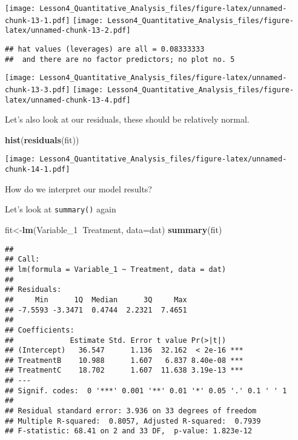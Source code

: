 \documentclass[
]{article}
\newenvironment{Shaded}{\begin{snugshade}}{\end{snugshade}}
\newcommand{\DataTypeTok}[1]{\textcolor[rgb]{0.13,0.29,0.53}{#1}}
\newcommand{\DecValTok}[1]{\textcolor[rgb]{0.00,0.00,0.81}{#1}}
\newcommand{\KeywordTok}[1]{\textcolor[rgb]{0.13,0.29,0.53}{\textbf{#1}}}
\newcommand{\NormalTok}[1]{#1}
\newcommand{\OperatorTok}[1]{\textcolor[rgb]{0.81,0.36,0.00}{\textbf{#1}}}
\begin{document}
\texttt{[image: Lesson4\_Quantitative\_Analysis\_files/figure-latex/unnamed-chunk-13-1.pdf]}
\texttt{[image: Lesson4\_Quantitative\_Analysis\_files/figure-latex/unnamed-chunk-13-2.pdf]}

\begin{verbatim}
## hat values (leverages) are all = 0.08333333
##  and there are no factor predictors; no plot no. 5
\end{verbatim}

\texttt{[image: Lesson4\_Quantitative\_Analysis\_files/figure-latex/unnamed-chunk-13-3.pdf]}
\texttt{[image: Lesson4\_Quantitative\_Analysis\_files/figure-latex/unnamed-chunk-13-4.pdf]}

Let's also look at our residuals, these should be relatively normal.

\begin{Shaded}
\begin{Highlighting}[]
\KeywordTok{hist}\NormalTok{(}\KeywordTok{residuals}\NormalTok{(fit))}
\end{Highlighting}
\end{Shaded}

\texttt{[image: Lesson4\_Quantitative\_Analysis\_files/figure-latex/unnamed-chunk-14-1.pdf]}

How do we interpret our model results?

Let's look at \texttt{summary()} again

\begin{Shaded}
\begin{Highlighting}[]
\NormalTok{fit<-}\KeywordTok{lm}\NormalTok{(Variable_}\DecValTok{1}\OperatorTok{~}\NormalTok{Treatment, }\DataTypeTok{data=}\NormalTok{dat)}
\KeywordTok{summary}\NormalTok{(fit)}
\end{Highlighting}
\end{Shaded}

\begin{verbatim}
## 
## Call:
## lm(formula = Variable_1 ~ Treatment, data = dat)
## 
## Residuals:
##     Min      1Q  Median      3Q     Max 
## -7.5593 -3.3471  0.4744  2.2321  7.4651 
## 
## Coefficients:
##             Estimate Std. Error t value Pr(>|t|)    
## (Intercept)   36.547      1.136  32.162  < 2e-16 ***
## TreatmentB    10.988      1.607   6.837 8.40e-08 ***
## TreatmentC    18.702      1.607  11.638 3.19e-13 ***
## ---
## Signif. codes:  0 '***' 0.001 '**' 0.01 '*' 0.05 '.' 0.1 ' ' 1
## 
## Residual standard error: 3.936 on 33 degrees of freedom
## Multiple R-squared:  0.8057, Adjusted R-squared:  0.7939 
## F-statistic: 68.41 on 2 and 33 DF,  p-value: 1.823e-12
\end{verbatim}
\end{document}
